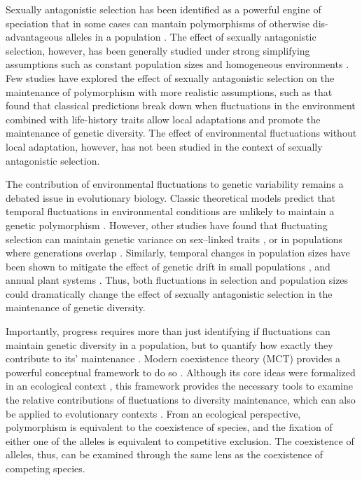 \documentclass[12pt]{article}
\begin{document}
Sexually antagonistic selection has been identified as a powerful engine of speciation that in some cases can mantain polymorphisms of otherwise dis-advantageous alleles in a population \citep{gavrilets2014sexual}. The effect of sexually antagonistic selection, however, has been generally studied under strong simplifying assumptions such as constant population sizes and homogeneous environments \citep{kidwell1977regions, pamilo1979genic, immler2012ploidally}. Few studies have explored the effect of sexually antagonistic selection on the maintenance of polymorphism with more realistic assumptions, such as \citet{connallon_evolutionary_2018} that found that classical predictions break down when fluctuations in the environment combined with life-history traits allow local adaptations and promote the maintenance of genetic diversity. The effect of environmental fluctuations without local adaptation, however, has not been studied in the context of sexually antagonistic selection.


The contribution of environmental fluctuations to genetic variability remains a debated issue in evolutionary biology. Classic theoretical models predict that temporal fluctuations in environmental conditions are unlikely to maintain a genetic polymorphism \citep{hedrick1974genetic,hedrick1986genetic}. However, other studies have found that fluctuating selection can maintain genetic variance on sex--linked traits \citep{reinhold2000maintenance}, or in populations where generations overlap \citep{ellner1994role, ellner1996patterns}. Similarly, temporal changes in population sizes have been shown to mitigate the effect of genetic drift in small populations \citep{pemberton1996maintenance}, and annual plant systems \citep{nunney2002effective}. Thus, both fluctuations in selection and population sizes could dramatically change the effect of sexually antagonistic selection in the maintenance of genetic diversity.


Importantly, progress requires more than just identifying if fluctuations can maintain genetic diversity in a population, but to quantify how exactly they contribute to its' maintenance \citep{ellner2016quantify}. Modern coexistence theory (MCT) provides a powerful conceptual framework to do so \citep{Chesson2000,chesson1994multispecies, barabas_chessons_2018}. Although its core ideas were formalized in an ecological context \citep{chesson1994multispecies,chesson2000general}, this framework provides the necessary tools to examine the relative contributions of fluctuations to diversity maintenance, which can also be applied to evolutionary contexts  \citep{ellner1996patterns,reinhold2000maintenance}. From an ecological perspective, polymorphism is equivalent to the coexistence of species, and the fixation of either one of the alleles is equivalent to competitive exclusion. The coexistence of alleles, thus, can be examined through the same lens as the coexistence of competing species.
\end{document}
